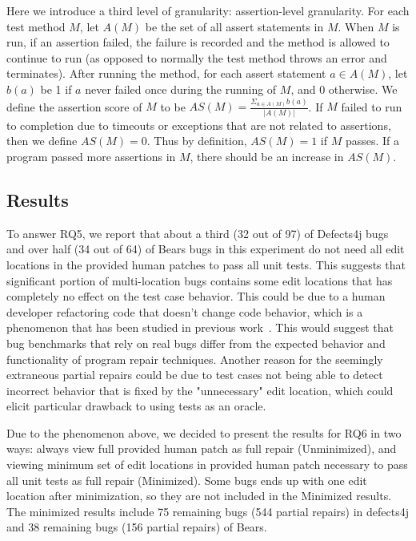 \documentclass[sigconf, timestamp-false, anonymous=true]{acmart}
\begin{document}
Here we introduce a third level of granularity: assertion-level granularity. 
For each test method $M$, let $A(M)$ be the set of all assert statements in $M$. 
When $M$ is run, if an assertion failed, the failure is recorded and the method 
is allowed to continue to run (as opposed to normally the test method throws an 
error and terminates). After running the method, for each assert statement 
$a\in A(M)$, let $b(a)$ be 1 if $a$ never failed once during the running of $M$, 
and 0 otherwise. We define the assertion score of $M$ to be 
$AS(M)=\frac{\Sigma_{a\in A(M)}b(a)}{|A(M)|}$. If $M$ failed to run to completion 
due to timeouts or exceptions that are not related to assertions, then we define 
$AS(M)=0$. Thus by definition, $AS(M)=1$ if $M$ passes. If a program passed more 
assertions in $M$, there should be an increase in $AS(M)$.


\subsection{Results}

To answer RQ5, we report that about a 
third (32 out of 97) of Defects4j bugs and over half (34 out of 64) of
Bears bugs in this experiment do not need all edit locations in the provided human patches 
to pass
all unit tests. This suggests that significant portion of multi-location bugs contains some
edit locations that has completely no effect on the test case behavior. This could be due to a 
human developer refactoring code that doesn't change code behavior, which is a 
phenomenon that has been studied in previous work~\cite{tangledchanges}. This would 
suggest that bug benchmarks that rely on real bugs differ from the expected behavior and 
functionality of program repair techniques. Another reason for the seemingly extraneous 
partial repairs could be due to test cases not being able to detect incorrect behavior that is 
fixed
by the "unnecessary" edit location, which could elicit particular drawback to using tests as an 
oracle.

Due to the phenomenon above, we decided to present the results for RQ6 in two ways: 
always view full provided human patch as full repair
(Unminimized), and viewing minimum set of edit locations in provided human patch necessary
to pass all unit tests as full repair (Minimized).
Some bugs ends up with one edit location after minimization, 
so they are not included in the Minimized results. The minimized results 
include 75 remaining bugs (544 partial repairs) in defects4j and 38 remaining bugs (156 partial repairs) of Bears. 
\end{document}
